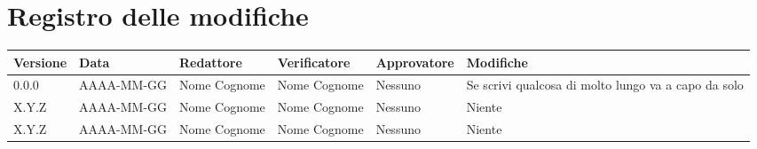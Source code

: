 \section*{Registro delle modifiche}

\begin{table}[H]
	\centering
	\fontsize{10}{12}\selectfont
	\begin{tabularx}{\textwidth}{l|l|l|l|l|X}
		\textbf{Versione}     & \textbf{Data}        & \textbf{Redattore} &
		\textbf{Verificatore} & \textbf{Approvatore} & \textbf{Modifiche}                                      \\
		\toprule
		0.0.0                 & AAAA-MM-GG           & Nome Cognome       & Nome Cognome & Nessuno & Se scrivi
		qualcosa di molto lungo va a capo da solo                                                              \\
		X.Y.Z                 & AAAA-MM-GG           & Nome Cognome       & Nome Cognome & Nessuno & Niente    \\
		X.Y.Z                 & AAAA-MM-GG           & Nome Cognome       & Nome Cognome & Nessuno & Niente    \\
		\bottomrule
	\end{tabularx}
\end{table}
